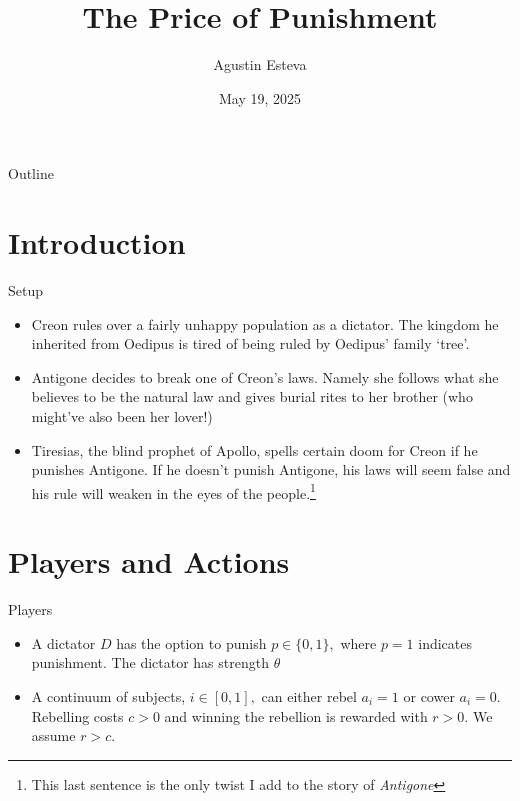 \documentclass{beamer}
\title{The Price of Punishment}
\author{Agustin Esteva}
\date{May 19, 2025}
\begin{document}
\begin{frame}
    \titlepage
\end{frame}

\begin{frame}{Outline}
    \tableofcontents
\end{frame}

\section{Introduction}
\begin{frame}{Setup}
    \begin{itemize}
        \item Creon rules over a fairly unhappy population as a dictator. The kingdom he inherited from Oedipus is tired of being ruled by Oedipus' family `tree'.
        \item Antigone decides to break one of Creon's laws. Namely she follows what she believes to be the natural law and gives burial rites to her brother (who might've also been her lover!)
        \item Tiresias, the blind prophet of Apollo, spells certain doom for Creon if he punishes Antigone. If he doesn't punish Antigone, his laws will seem false and his rule will weaken in the eyes of the people.\footnote{This last sentence is the only twist I add to the story of \textit{Antigone}}
    \end{itemize}
\end{frame}

\section{Players and Actions}
\begin{frame}{Players}
    \begin{itemize}
        \item A dictator $D$ has the option to punish $p\in \{0,1\},$ where $p =1 $ indicates punishment. The dictator has strength $\theta$
        \item A continuum of subjects, $i \in [0,1],$ can either rebel $a_i = 1$ or cower $a_i = 0.$ Rebelling costs $c>0$ and winning the rebellion is rewarded with $r>0.$ We assume $r>c.$
    \end{itemize}
\end{frame}
\end{document}

